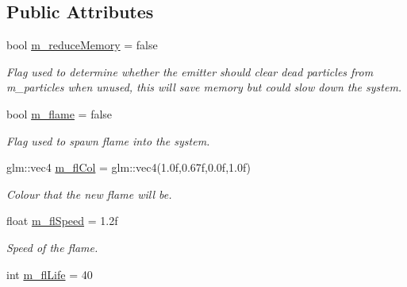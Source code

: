 \subsection*{Public Attributes}
\begin{DoxyCompactItemize}
\item 
\hypertarget{classEmitter_a1cecbc82f0907e305afb6d6a4d6a3021}{bool \hyperlink{classEmitter_a1cecbc82f0907e305afb6d6a4d6a3021}{m\-\_\-reduce\-Memory} = false}\label{classEmitter_a1cecbc82f0907e305afb6d6a4d6a3021}

\begin{DoxyCompactList}\small\item\em Flag used to determine whether the emitter should clear dead particles from m\-\_\-particles when unused, this will save memory but could slow down the system. \end{DoxyCompactList}\item 
\hypertarget{classEmitter_a24c3fe59e6f1ac64d61a9681d7a6c943}{bool \hyperlink{classEmitter_a24c3fe59e6f1ac64d61a9681d7a6c943}{m\-\_\-flame} = false}\label{classEmitter_a24c3fe59e6f1ac64d61a9681d7a6c943}

\begin{DoxyCompactList}\small\item\em Flag used to spawn flame into the system. \end{DoxyCompactList}\item 
\hypertarget{classEmitter_acd5d5ce9370f9e45d73ec7182155ad69}{glm\-::vec4 \hyperlink{classEmitter_acd5d5ce9370f9e45d73ec7182155ad69}{m\-\_\-fl\-Col} = glm\-::vec4(1.\-0f,0.\-67f,0.\-0f,1.\-0f)}\label{classEmitter_acd5d5ce9370f9e45d73ec7182155ad69}

\begin{DoxyCompactList}\small\item\em Colour that the new flame will be. \end{DoxyCompactList}\item 
\hypertarget{classEmitter_a7835d97db9ca64b7534eba110e0f7845}{float \hyperlink{classEmitter_a7835d97db9ca64b7534eba110e0f7845}{m\-\_\-fl\-Speed} = 1.\-2f}\label{classEmitter_a7835d97db9ca64b7534eba110e0f7845}

\begin{DoxyCompactList}\small\item\em Speed of the flame. \end{DoxyCompactList}\item 
\hypertarget{classEmitter_a4e024aa6c38ea9eb95c076d2325e0dfe}{int \hyperlink{classEmitter_a4e024aa6c38ea9eb95c076d2325e0dfe}{m\-\_\-fl\-Life} = 40}\label{classEmitter_a4e024aa6c38ea9eb95c076d2325e0dfe}


\end{DoxyCompactItemize}
